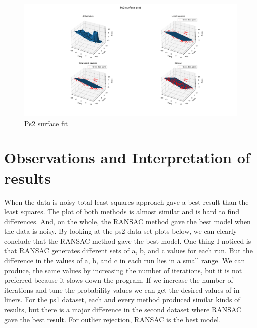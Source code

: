 \begin{figure}[!h]
    \includegraphics[width= 1.2\textwidth, trim= 8.5cm 0 0 0]{txt/Proj1_2ps2.png}
    \caption{Ps2 surface fit}
    \label{fig:my_label}
\end{figure}

\section{Observations and Interpretation of results}
    When the data is noisy total least squares approach gave a best result than the least squares. The plot of both methods is almost similar and is hard to find differences. And, on the whole, the RANSAC method gave the best model when the data is noisy. By looking at the ps2 data set plots below, we can clearly conclude that the RANSAC method gave the best model. One thing I noticed is that RANSAC generates different sets of a, b, and c values for each run. But the difference in the values of a, b, and c in each run lies in a small range. We can produce, the same values by increasing the number of iterations, but it is not preferred because it slows down the program, If we increase the number of iterations and tune the probability values we can get the desired values of in-liners. For the ps1 dataset, each and every method produced similar kinds of results, but there is a major difference in the second dataset where RANSAC gave the best result. For outlier rejection, RANSAC is the best model.
\pagebreak

